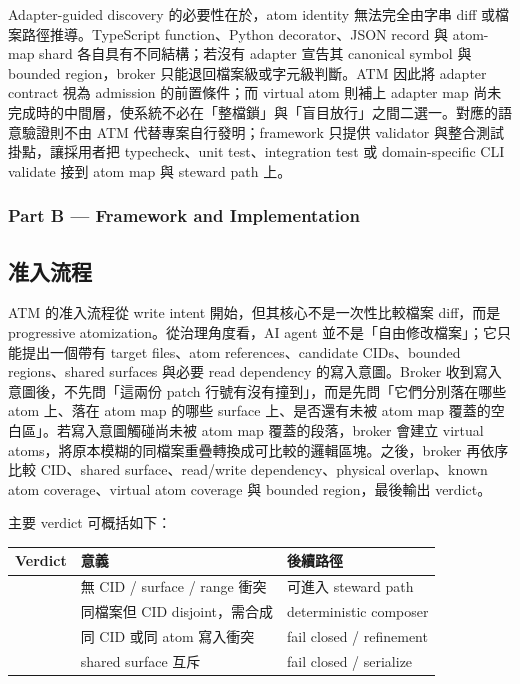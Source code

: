 \documentclass[a4paper,fontset=none]{ctexart}
\begin{document}
Adapter-guided discovery 的必要性在於，atom identity 無法完全由字串 diff 或檔案路徑推導。TypeScript function、Python decorator、JSON record 與 atom-map shard 各自具有不同結構；若沒有 adapter 宣告其 canonical symbol 與 bounded region，broker 只能退回檔案級或字元級判斷。ATM 因此將 adapter contract 視為 admission 的前置條件；而 virtual atom 則補上 adapter map 尚未完成時的中間層，使系統不必在「整檔鎖」與「盲目放行」之間二選一。對應的語意驗證則不由 ATM 代替專案自行發明；framework 只提供 validator 與整合測試掛點，讓採用者把 typecheck、unit test、integration test 或 domain-specific CLI validate 接到 atom map 與 steward path 上。

\medskip

\subsubsection*{Part B --- Framework and Implementation}

\subsection{准入流程}

ATM 的准入流程從 write intent 開始，但其核心不是一次性比較檔案 diff，而是 progressive atomization。從治理角度看，AI agent 並不是「自由修改檔案」；它只能提出一個帶有 target files、atom references、candidate CIDs、bounded regions、shared surfaces 與必要 read dependency 的寫入意圖。Broker 收到寫入意圖後，不先問「這兩份 patch 行號有沒有撞到」，而是先問「它們分別落在哪些 atom 上、落在 atom map 的哪些 surface 上、是否還有未被 atom map 覆蓋的空白區」。若寫入意圖觸碰尚未被 atom map 覆蓋的段落，broker 會建立 virtual atoms，將原本模糊的同檔案重疊轉換成可比較的邏輯區塊。之後，broker 再依序比較 CID、shared surface、read/write dependency、physical overlap、known atom coverage、virtual atom coverage 與 bounded region，最後輸出 verdict。

主要 verdict 可概括如下：

\smallskip{}\par\smallskip

\begingroup
\footnotesize
{}
\begin{longtable}{L{0.28\textwidth}L{0.28\textwidth}L{0.28\textwidth}}
\toprule
Verdict & 意義 & 後續路徑 \\
\midrule
\texttt{} & 無 CID / surface / range 衝突 & 可進入 steward path \\
\texttt{} & 同檔案但 CID disjoint，需合成 & deterministic composer \\
\texttt{} & 同 CID 或同 atom 寫入衝突 & fail closed / refinement \\
\texttt{} & shared surface 互斥 & fail closed / serialize \\
\bottomrule
\end{longtable}
\endgroup
\end{document}

